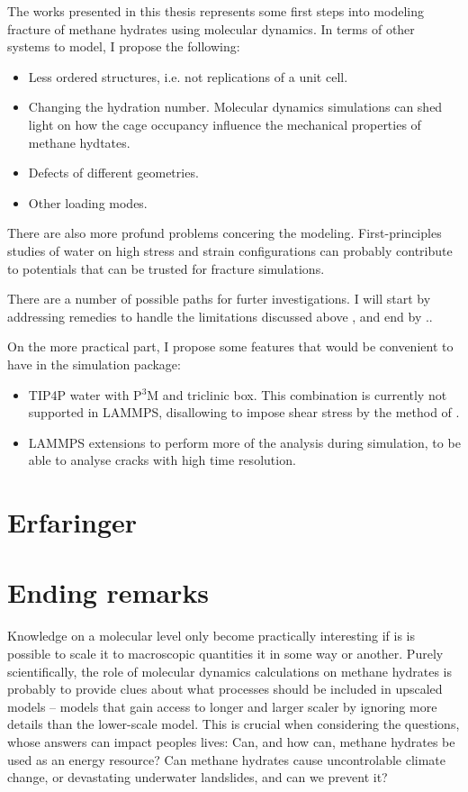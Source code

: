 The works presented in this thesis represents some first steps into modeling fracture of methane hydrates using molecular dynamics. In terms of other systems to model, I propose the following:
%
\begin{itemize}
\item Less ordered structures, i.e. not replications of a unit cell.
\item Changing the hydration number. Molecular dynamics simulations can shed light on how the cage occupancy influence the mechanical properties of methane hydtates.
\item Defects of different geometries.
\item Other loading modes.
\end{itemize}
%
There are also more profund problems concering the modeling. First-principles studies of water on high stress and strain configurations can probably contribute to potentials that can be trusted for fracture simulations. 

There are a number of possible paths for furter investigations. I will start by addressing remedies to handle the limitations discussed above , and end by ..

On the more practical part, I propose some features that would be convenient to have in the simulation package:
\begin{itemize}
\item TIP4P water with P$^3$M and triclinic box. This combination is currently not supported in LAMMPS, disallowing to impose shear stress by the method of \citet{Parrinello1981}.
\item LAMMPS extensions to perform more of the analysis during simulation, to be able to analyse cracks with high time resolution.
\end{itemize}
 

\section{Erfaringer}

\section{Ending remarks}
Knowledge on a molecular level only become practically interesting if is is possible to scale it to macroscopic quantities it in some way or another. Purely scientifically, the role of molecular dynamics calculations on methane hydrates is probably to provide clues about what processes should be included in upscaled models -- models that gain access to longer and larger scaler by ignoring more details than the lower-scale model. This is crucial when considering the questions, whose answers can impact peoples lives: Can, and how can, methane hydrates be used as an energy resource? Can methane hydrates cause uncontrolable climate change, or devastating underwater landslides, and can we prevent it? 